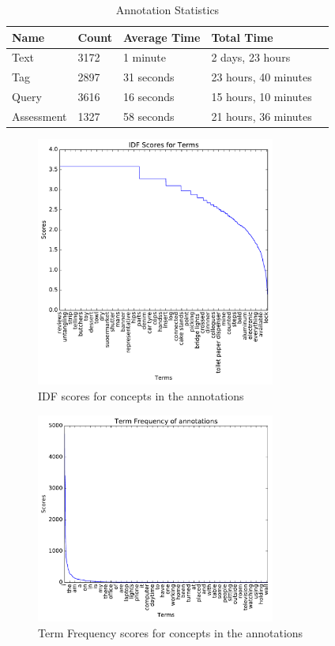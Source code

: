\begin{table}[ht]
    \centering
    \begin{tabular}{ | l | l | l | l | p{5cm} |}
    \hline
    Name & Count & Average Time & Total Time \\ \hline
    Text & 3172 & 1 minute & 2 days, 23 hours \\ \hline
    Tag & 2897 & 31 seconds & 23 hours, 40 minutes \\ \hline
    Query & 3616 & 16 seconds & 15 hours, 10 minutes \\ \hline
    Assessment & 1327 & 58 seconds & 21 hours, 36 minutes \\ \hline
    \end{tabular}
    \caption{Annotation Statistics}
    \label{table:annotation-stats}
\end{table}

\begin{figure}[ht]
    \centering
    \includegraphics[width=0.7\textwidth]{graphs/idf-scores}
    \caption{IDF scores for concepts in the annotations}
    \label{fig:idf-scores}
\end{figure}

\begin{figure}[ht]
    \centering
    \includegraphics[width=0.7\textwidth]{graphs/tf-scores}
    \caption{Term Frequency scores for concepts in the annotations}
    \label{fig:tf-scores}
\end{figure}


